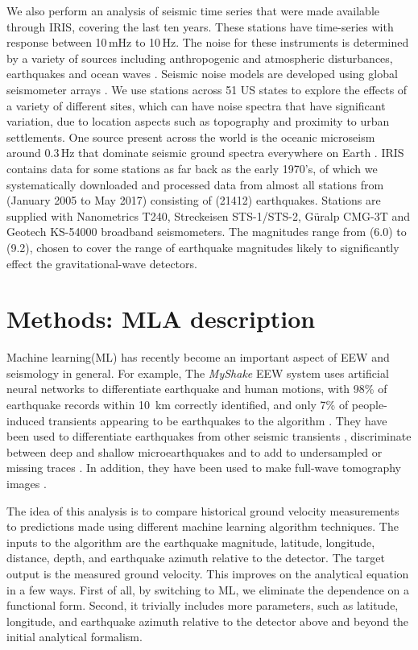 \documentclass[twocolumn, aps, superscriptaddress]{revtex4}
\newcommand{\rednote}[1]{{\color{red} (#1)}}
\begin{document}
We also perform an analysis of seismic time series that were made available through IRIS, covering the last ten years. These stations have time-series with response between 10\,mHz to 10\,Hz. The noise for these instruments is determined by a variety of sources including anthropogenic and atmospheric disturbances, earthquakes and ocean waves \cite{BCB2006}. 
Seismic noise models are developed using global seismometer arrays  \cite{Pet1993,BDE2004,McEA2009}.
We use stations across 51 US states to explore the effects of a variety of different sites, which can have noise spectra that have significant variation, due to location aspects such as topography and proximity to urban settlements.
One source present across the world is the oceanic microseism around 0.3\,Hz that dominate seismic ground spectra everywhere on Earth \cite{HMS1963,ToLa1968,Ces1994,FKK1998}. IRIS contains data for some stations as far back as the early 1970's, of which we systematically downloaded and processed data from almost all stations from \rednote{January 2005 to May 2017} consisting of  \rednote{21412} earthquakes. Stations are supplied with Nanometrics T240, Streckeisen STS-1/STS-2, G\"uralp CMG-3T and Geotech KS-54000 broadband seismometers. 
The magnitudes range from \rednote{6.0} to \rednote{9.2}, chosen to cover the range of earthquake magnitudes likely to significantly effect the gravitational-wave detectors.





\section{Methods: MLA description} \label{sec:MLA}

Machine learning(ML) has recently become an important aspect of EEW and seismology in general. For example,
The \emph{MyShake} EEW system uses artificial neural networks to differentiate earthquake and human motions, with 98\% of earthquake records within 10\, km correctly identified, and only 7\% of people-induced transients appearing to be earthquakes to the algorithm  \cite{KoAl2016}.
They have been used to differentiate earthquakes from other seismic transients \cite{KuYi2011,KoUs2016,PeGh2017}, discriminate between deep and shallow microearthquakes \cite{MoHo2016} and to add to undersampled or missing traces \cite{JiMa2017}. In addition, they have been used to make full-wave tomography images \cite{DiLe2011}.

The idea of this analysis is to compare historical ground velocity measurements to predictions made using different machine learning algorithm techniques. 
The inputs to the algorithm are the earthquake magnitude, latitude, longitude, distance, depth, and earthquake azimuth relative to the detector. 
The target output is the measured ground velocity.
This improves on the analytical equation in a few ways.
First of all, by switching to ML, we eliminate the dependence on a functional form.
Second, it trivially includes more parameters, such as latitude, longitude, and earthquake azimuth relative to the detector above and beyond the initial analytical formalism. 
\end{document}
